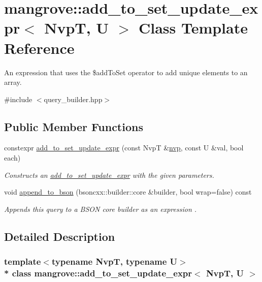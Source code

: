 \hypertarget{classmangrove_1_1add__to__set__update__expr}{}\section{mangrove\+:\+:add\+\_\+to\+\_\+set\+\_\+update\+\_\+expr$<$ NvpT, U $>$ Class Template Reference}
\label{classmangrove_1_1add__to__set__update__expr}


An expression that uses the \$add\+To\+Set operator to add unique elements to an array.  




{\ttfamily \#include $<$query\+\_\+builder.\+hpp$>$}

\subsection*{Public Member Functions}
\begin{DoxyCompactItemize}
\item 
constexpr \hyperlink{classmangrove_1_1add__to__set__update__expr_a17141f1c7a5875e69f93f39e701a8c36}{add\+\_\+to\+\_\+set\+\_\+update\+\_\+expr} (const NvpT \&\hyperlink{classmangrove_1_1nvp}{nvp}, const U \&val, bool each)
\begin{DoxyCompactList}\small\item\em Constructs an \hyperlink{classmangrove_1_1add__to__set__update__expr}{add\+\_\+to\+\_\+set\+\_\+update\+\_\+expr} with the given parameters. \end{DoxyCompactList}\item 
void \hyperlink{classmangrove_1_1add__to__set__update__expr_ad29e382108f904ef765c5ad7cb12d44a}{append\+\_\+to\+\_\+bson} (bsoncxx\+::builder\+::core \&builder, bool wrap=false) const 
\begin{DoxyCompactList}\small\item\em Appends this query to a B\+S\+ON core builder as an expression \textquotesingle{}. \end{DoxyCompactList}\end{DoxyCompactItemize}


\subsection{Detailed Description}
\subsubsection*{template$<$typename NvpT, typename U$>$\\*
class mangrove\+::add\+\_\+to\+\_\+set\+\_\+update\+\_\+expr$<$ Nvp\+T, U $>$}

